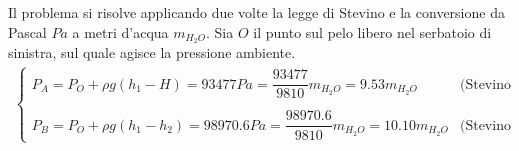 \documentclass[letterpaper,10pt,italian]{jupyterBook}
\begin{document}
\sphinxAtStartPar
{} Il problema si risolve applicando due volte la legge di Stevino e la
conversione da Pascal \(Pa\) a metri d’acqua \(m_{H_2O}\). Sia \(O\) il punto
sul pelo libero nel serbatoio  di sinistra, sul quale agisce la
pressione ambiente.
\begin{equation*}
\begin{split}\begin{cases}
  P_A = P_O + \rho g (h_1 - H)  = 93477 Pa = \dfrac{93477}{9810} m_{H_2O} = 9.53 m_{H_2O}  & \text{(Stevino O-A)} \\ \\
  P_B = P_O + \rho g (h_1 - h_2) = 98970.6 Pa = \dfrac{98970.6}{9810} m_{H_2O}= 10.10 m_{H_2O} & \text{(Stevino O-B)}
\end{cases}\end{split}
\end{equation*}
\sphinxstepscope
\end{document}
